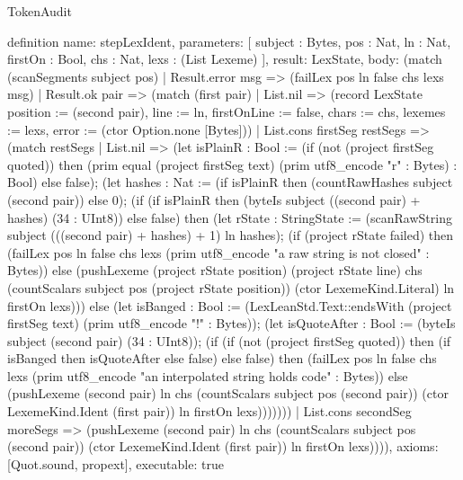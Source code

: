 \begin{lexlean}{TokenAudit}
\begin{semanticmodule}
definition{
  name: stepLexIdent,
  parameters: [
    subject : Bytes,
    pos : Nat,
    ln : Nat,
    firstOn : Bool,
    chs : Nat,
    lexs : (List Lexeme)
  ],
  result: LexState,
  body: (match (scanSegments subject pos)
    | Result.error msg => (failLex pos ln false chs lexs msg)
    | Result.ok pair => (match (first pair)
      | List.nil => (record LexState {position := (second pair), line := ln, firstOnLine := false, chars := chs, lexemes := lexs, error := (ctor Option.none [Bytes])})
      | List.cons firstSeg restSegs => (match restSegs
        | List.nil => (let isPlainR : Bool := (if (not (project firstSeg quoted)) then (prim equal (project firstSeg text) (prim utf8_encode "r" : Bytes) : Bool) else false); (let hashes : Nat := (if isPlainR then (countRawHashes subject (second pair)) else 0); (if (if isPlainR then (byteIs subject ((second pair) + hashes) (34 : UInt8)) else false) then (let rState : StringState := (scanRawString subject (((second pair) + hashes) + 1) ln hashes); (if (project rState failed) then (failLex pos ln false chs lexs (prim utf8_encode "a raw string is not closed" : Bytes)) else (pushLexeme (project rState position) (project rState line) chs (countScalars subject pos (project rState position)) (ctor LexemeKind.Literal) ln firstOn lexs))) else (let isBanged : Bool := (LexLeanStd.Text::endsWith (project firstSeg text) (prim utf8_encode "!" : Bytes)); (let isQuoteAfter : Bool := (byteIs subject (second pair) (34 : UInt8)); (if (if (not (project firstSeg quoted)) then (if isBanged then isQuoteAfter else false) else false) then (failLex pos ln false chs lexs (prim utf8_encode "an interpolated string holds code" : Bytes)) else (pushLexeme (second pair) ln chs (countScalars subject pos (second pair)) (ctor LexemeKind.Ident (first pair)) ln firstOn lexs)))))))
        | List.cons secondSeg moreSegs => (pushLexeme (second pair) ln chs (countScalars subject pos (second pair)) (ctor LexemeKind.Ident (first pair)) ln firstOn lexs)))),
  axioms: [Quot.sound, propext],
  executable: true
}


\end{semanticmodule}
\end{lexlean}
